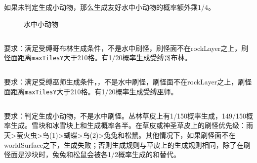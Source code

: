如果未判定生成小动物，那么生成友好水中小动物的概率额外乘1/4。
\begin{figure}[!ht]
    \centering
    \caption{水中小动物}
\end{figure}

\subsection{}
要求：满足受缚哥布林生成条件，不是水中刷怪，刷怪面不在rockLayer之上，刷怪面距离\lstinline{maxTilesY}大于210格。有1/20概率生成受缚哥布林。

\subsection{}
要求：满足受缚巫师生成条件，，不是水中刷怪，刷怪面不在rockLayer之上，刷怪面距离\lstinline{maxTilesY}大于210格。有1/20概率生成受缚巫师。
\begin{figure}[!ht]
    \centering
    \caption{}
\end{figure}

\subsection{}
要求：判定生成小动物，不是水中刷怪。丛林草皮上有1/150概率生成，149/150概率生成。雪块和冰雪块上和生成概率各半。在草皮或神圣草皮上的刷怪优先级：雨天>萤火虫>鸟(1)>蝴蝶>鸟(2)>兔兔和松鼠。其他情况下，如果刷怪面不在worldSurface之下，生成失败；否则生成规则与草皮上的生成规则相同，除了在刷怪面是沙块时，兔兔和松鼠会被各1/2概率生成的和替代。


